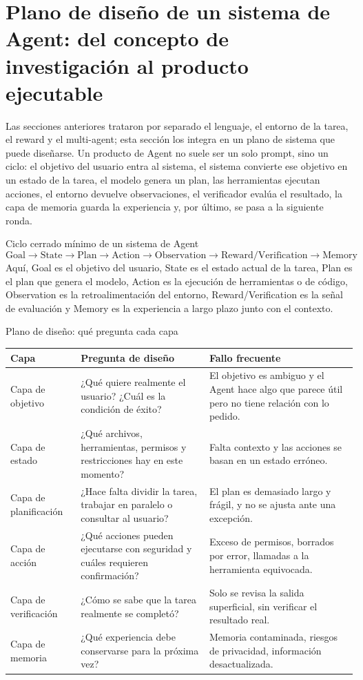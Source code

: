 \section{Plano de diseño de un sistema de Agent: del concepto de investigación al producto ejecutable}

Las secciones anteriores trataron por separado el lenguaje, el entorno de la tarea, el reward y el multi-agent; esta sección los integra en un plano de sistema que puede diseñarse. Un producto de Agent no suele ser un solo prompt, sino un ciclo: el objetivo del usuario entra al sistema, el sistema convierte ese objetivo en un estado de la tarea, el modelo genera un plan, las herramientas ejecutan acciones, el entorno devuelve observaciones, el verificador evalúa el resultado, la capa de memoria guarda la experiencia y, por último, se pasa a la siguiente ronda.

\begin{importantbox}{Ciclo cerrado mínimo de un sistema de Agent}
\[
\text{Goal} \rightarrow \text{State} \rightarrow \text{Plan} \rightarrow \text{Action} \rightarrow \text{Observation} \rightarrow \text{Reward/Verification} \rightarrow \text{Memory}
\]
Aquí, Goal es el objetivo del usuario, State es el estado actual de la tarea, Plan es el plan que genera el modelo, Action es la ejecución de herramientas o de código, Observation es la retroalimentación del entorno, Reward/Verification es la señal de evaluación y Memory es la experiencia a largo plazo junto con el contexto.
\end{importantbox}

\begin{knowledgebox}{Plano de diseño: qué pregunta cada capa}
\begin{tabularx}{\textwidth}{p{}p{}X}
\toprule
Capa & Pregunta de diseño & Fallo frecuente \\
\midrule
Capa de objetivo & ¿Qué quiere realmente el usuario? ¿Cuál es la condición de éxito? & El objetivo es ambiguo y el Agent hace algo que parece útil pero no tiene relación con lo pedido. \\
Capa de estado & ¿Qué archivos, herramientas, permisos y restricciones hay en este momento? & Falta contexto y las acciones se basan en un estado erróneo. \\
Capa de planificación & ¿Hace falta dividir la tarea, trabajar en paralelo o consultar al usuario? & El plan es demasiado largo y frágil, y no se ajusta ante una excepción. \\
Capa de acción & ¿Qué acciones pueden ejecutarse con seguridad y cuáles requieren confirmación? & Exceso de permisos, borrados por error, llamadas a la herramienta equivocada. \\
Capa de verificación & ¿Cómo se sabe que la tarea realmente se completó? & Solo se revisa la salida superficial, sin verificar el resultado real. \\
Capa de memoria & ¿Qué experiencia debe conservarse para la próxima vez? & Memoria contaminada, riesgos de privacidad, información desactualizada. \\
\bottomrule
\end{tabularx}
\end{knowledgebox}

